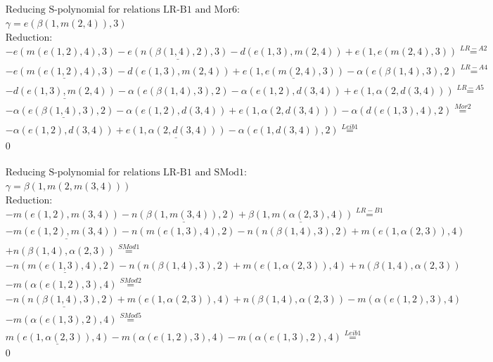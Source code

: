 \documentclass[11pt]{amsart}
\begin{document}
\begin{align*} 
& \text{Reducing S-polynomial for relations LR-B1 and Mor6:} \\ 
& \gamma = e(\beta(1,m(2,4)),3) \\ 
& \text{Reduction}: \\& - e(m(e(1,2),4),3) - \underline{e(n(\beta(1,4),2),3)} - d(e(1,3),m(2,4)) + e(1,e(m(2,4),3)) \stackrel{ LR-A2 }{=}  \\ 
& - \underline{e(m(e(1,2),4),3)} - d(e(1,3),m(2,4)) + \underline{e(1,e(m(2,4),3))} - \alpha(e(\beta(1,4),3),2) \stackrel{ LR-A4 }{=}  \\ 
& - \underline{d(e(1,3),m(2,4))} - \alpha(e(\beta(1,4),3),2) - \alpha(e(1,2),d(3,4)) + e(1,\alpha(2,d(3,4))) \stackrel{ LR-A5 }{=}  \\ 
& - \underline{\alpha(e(\beta(1,4),3),2)} - \alpha(e(1,2),d(3,4)) + e(1,\alpha(2,d(3,4))) - \alpha(d(e(1,3),4),2) \stackrel{ Mor2 }{=}  \\ 
& - \alpha(e(1,2),d(3,4)) + \underline{e(1,\alpha(2,d(3,4)))} - \alpha(e(1,d(3,4)),2) \stackrel{ Leib1 }{=}  \\ 
&0\\ 
\end{align*} 
 
\begin{align*} 
& \text{Reducing S-polynomial for relations LR-B1 and SMod1:} \\ 
& \gamma = \beta(1,m(2,m(3,4))) \\ 
& \text{Reduction}: \\& - m(e(1,2),m(3,4)) - \underline{n(\beta(1,m(3,4)),2)} + \underline{\beta(1,m(\alpha(2,3),4))} \stackrel{ LR-B1 }{=}  \\ 
& - \underline{m(e(1,2),m(3,4))} - n(m(e(1,3),4),2) - n(n(\beta(1,4),3),2) + m(e(1,\alpha(2,3)),4)\\ 
 &  + n(\beta(1,4),\alpha(2,3)) \stackrel{ SMod1 }{=}  \\ 
& - \underline{n(m(e(1,3),4),2)} - n(n(\beta(1,4),3),2) + m(e(1,\alpha(2,3)),4) + n(\beta(1,4),\alpha(2,3))\\ 
 &  - m(\alpha(e(1,2),3),4) \stackrel{ SMod2 }{=}  \\ 
& - \underline{n(n(\beta(1,4),3),2)} + m(e(1,\alpha(2,3)),4) + n(\beta(1,4),\alpha(2,3)) - m(\alpha(e(1,2),3),4)\\ 
 &  - m(\alpha(e(1,3),2),4) \stackrel{ SMod5 }{=}  \\ 
&\underline{m(e(1,\alpha(2,3)),4)} - m(\alpha(e(1,2),3),4) - m(\alpha(e(1,3),2),4) \stackrel{ Leib1 }{=}  \\ 
&0\\ 
\end{align*} 
 
\end{document}
